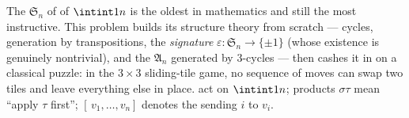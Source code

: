 \begin{problem}\label{pb:b1:structures:1}
The  $\mathfrak S_n$ of  of $\intint1n$ is the
oldest  in mathematics and still the most instructive. This
problem builds its structure theory from scratch --- cycles,
generation by transpositions, the \emph{signature} 
$\varepsilon \colon \mathfrak S_n \to \{\pm1\}$ (whose existence is
genuinely nontrivial), and the  $\mathfrak A_n$
generated by $3$-cycles --- then cashes it in on a classical
puzzle: in the $3 \times 3$ sliding-tile game, no sequence of moves
can swap two tiles and leave everything else in place.
 act on $\intint1n$; products $\sigma\tau$ mean
``apply $\tau$ first''; $[\,v_1, \dots, v_n]$ denotes the
 sending $i$ to $v_i$.


\end{problem}
